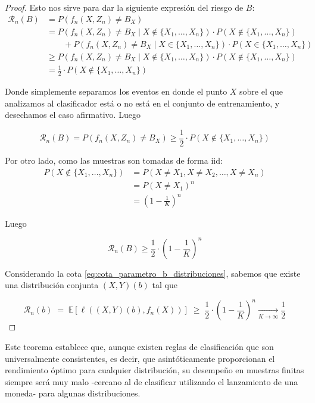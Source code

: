 \documentclass{report}
\begin{document}
\begin{proof}
Esto nos sirve para
dar la siguiente expresión del riesgo de $B$:\newline
\begin{equation*}
    \begin{aligned}
        \mathcal{R}_n(B) &= P(f_n(X, Z_n) \neq B_X)\\
        &= P(f_n(X, Z_n) \neq B_X \mid X \notin \{X_1, \dots, X_n\}) \cdot P(X \notin \{X_1, \dots, X_n\})\\
        &  \qquad + P(f_n(X, Z_n) \neq B_X \mid X \in \{X_1, \dots, X_n\}) \cdot P(X \in \{X_1, \dots, X_n\})\\
        &\geq P(f_n(X, Z_n) \neq B_X \mid X \notin \{X_1, \dots, X_n\}) \cdot P(X \notin \{X_1, \dots, X_n\})\\
        & = \frac{1}{2} \cdot P(X \notin \{X_1, \dots, X_n\})
    \end{aligned}
\end{equation*}

Donde simplemente separamos los eventos en donde el punto $X$ sobre el que analizamos al clasificador está o no está
en el conjunto de entrenamiento, y desechamos el caso afirmativo. Luego

\[
\mathcal{R}_n(B) = P(f_n(X, Z_n) \neq B_X) \geq \frac{1}{2} \cdot P(X \notin \{X_1, \dots, X_n\})
\]

Por otro lado, como las muestras son tomadas de forma iid:
\[
\begin{aligned}
    P(X \notin \{X_1, \dots, X_n\}) &= P(X\neq X_1, X\neq X_2, \dots, X\neq X_n) \\
   &= P(X\neq X_1)^n \\
   &= \left(1-\frac{1}{K}\right)^n
\end{aligned}
\]

Luego

\[
\mathcal{R}_n(B) \geq \frac{1}{2} \cdot \left(1-\frac{1}{K}\right)^n
\]

Considerando la cota \ref{eq:cota_parametro_b_distribuciones}, sabemos que existe una distribución
conjunta $(X,Y)(b)$ tal que 

\[
\mathcal{R}_n(b) \; =\; \mathbb{E}[\ell((X,Y)(b),f_n(X))] \; \geq \;  \frac{1}{2} \cdot \left(1-\frac{1}{K}\right)^n \xrightarrow[K \to \infty]{} \frac{1}{2}
\]


\end{proof}

Este teorema establece que, aunque existen reglas de clasificación que son universalmente 
consistentes, es decir, que asintóticamente proporcionan el rendimiento óptimo para cualquier 
distribución, su desempeño en muestras finitas siempre será muy malo -cercano al de clasificar utilizando el lanzamiento de una moneda- para algunas 
distribuciones. \newline
\end{document}
